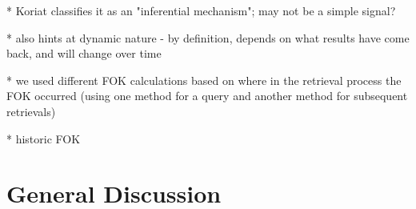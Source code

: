 \documentclass[10pt,letterpaper]{article}
\begin{document}
   
* Koriat classifies it as an "inferential mechanism"; may not be a simple signal?


            * also hints at dynamic nature - by definition, depends on what results have come back, and will change over time

            
* we used different FOK calculations based on where in the retrieval process the FOK occurred (using one method for a query and another method for subsequent retrievals)


* historic FOK

\section{General Discussion}


%



\setlength{\bibleftmargin}{.125in}
\setlength{\bibindent}{-\bibleftmargin}


\end{document}
